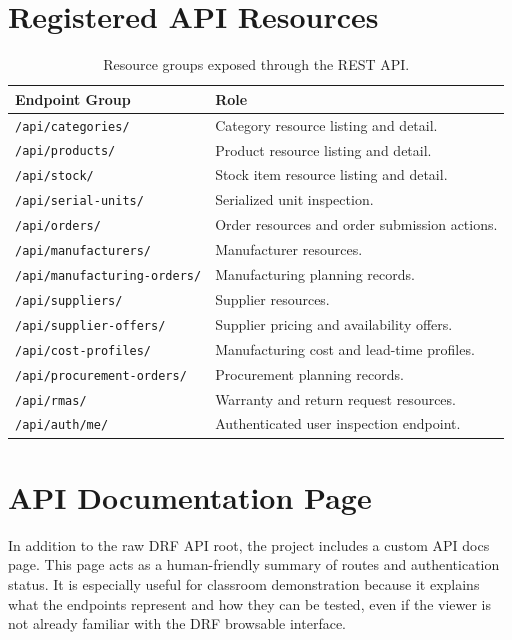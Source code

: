 \documentclass[12pt,letterpaper,oneside,openany]{book}
\begin{document}
\section{Registered API Resources}

\begin{table}[H]
\centering
\begin{tabular}{|p{2.4in}|p{2.7in}|}
\hline
\textbf{Endpoint Group} & \textbf{Role} \\ \hline
\texttt{/api/categories/} & Category resource listing and detail. \\ \hline
\texttt{/api/products/} & Product resource listing and detail. \\ \hline
\texttt{/api/stock/} & Stock item resource listing and detail. \\ \hline
\texttt{/api/serial-units/} & Serialized unit inspection. \\ \hline
\texttt{/api/orders/} & Order resources and order submission actions. \\ \hline
\texttt{/api/manufacturers/} & Manufacturer resources. \\ \hline
\texttt{/api/manufacturing-orders/} & Manufacturing planning records. \\ \hline
\texttt{/api/suppliers/} & Supplier resources. \\ \hline
\texttt{/api/supplier-offers/} & Supplier pricing and availability offers. \\ \hline
\texttt{/api/cost-profiles/} & Manufacturing cost and lead-time profiles. \\ \hline
\texttt{/api/procurement-orders/} & Procurement planning records. \\ \hline
\texttt{/api/rmas/} & Warranty and return request resources. \\ \hline
\texttt{/api/auth/me/} & Authenticated user inspection endpoint. \\ \hline
\end{tabular}
\caption{Resource groups exposed through the REST API.}
\label{tab:api_resources}
\end{table}

\section{API Documentation Page}

\begin{justifying}
In addition to the raw DRF API root, the project includes a custom API docs
page. This page acts as a human-friendly summary of routes and authentication
status. It is especially useful for classroom demonstration because it explains
what the endpoints represent and how they can be tested, even if the viewer is
not already familiar with the DRF browsable interface.
\end{justifying}
\end{document}
